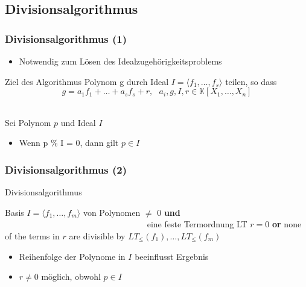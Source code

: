 \documentclass{beamer}
\begin{document}
\subsection{Divisionsalgorithmus}
\begin{frame}
\frametitle{Divisionsalgorithmus (1)}



\begin{itemize}
\item Notwendig zum Lösen des Idealzugehörigkeitsproblems


\end{itemize}

\begin{block}{Ziel des Algorithmus}
Polynom g durch Ideal $ I = \langle f_{1}, \dots , f_{s} \rangle  $ teilen, so dass 
\[ g = a_{1}f_{1} + \ldots + a_{s}f_{s} + r ,~~~ a_{i},g,I,r \in \mathbb{K}\left[X_{1}, \dots, X_{n}\right]  \]
\end{block}

~\\

Sei Polynom $p$ und Ideal $I$  

\begin{itemize}
\item Wenn p \% I = 0, dann gilt $ p \in I$


\end{itemize}



	
\end{frame}


\begin{frame}[fragile]
\frametitle{Divisionsalgorithmus (2)}




\begin{algorithm}[H]
\caption{Divisionsalgorithmus  }

\begin{algorithmic}[1]

\Require Basis $I = \langle f_{1}, \dots, f_{m}\rangle$ von Polynomen $\neq$ 0 \textbf{und} ~~~~~~~~~~~~~~~~~~~~~~~~~~~~~~~~~ eine feste Termordnung \textsc{LT}  
\Ensure $r=0$ \textbf{or} none of the terms in $r$ are divisible by $ LT_{\leq}\left( f_{1}\right) , \dots , LT_{\leq} \left( f_{m}\right) $

\end{algorithmic}
\end{algorithm}


\begin{itemize}
\item Reihenfolge der Polynome in $I$ beeinflusst Ergebnis
\item $r \neq 0$ möglich, obwohl $p \in I$ 
\end{itemize}


\end{frame}
\end{document}
